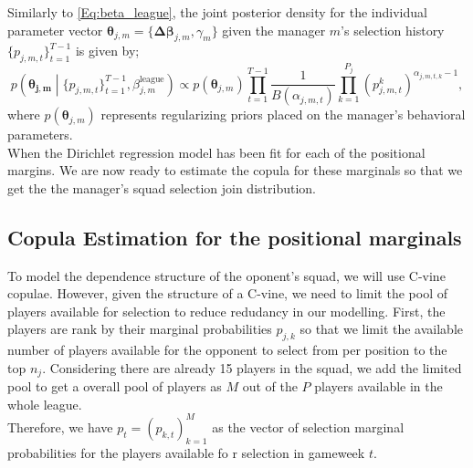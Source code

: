\documentclass[12pt,oneside,a4paper]{book}
\theoremstyle{definition}
\theoremstyle{remark}
\begin{document}
				Similarly to \eqref{Eq:beta_league}, the joint posterior density for the individual parameter vector $\boldsymbol{\theta}_{j,m} = \{\boldsymbol{\Delta\beta}_{j,m}, \gamma_m\}$ given the manager $m$'s selection history $\{p_{j,m,t}\}_{t=1}^{T-1}$ is given by;
				\begin{equation}\label{Eq:posterior_manager}
					p\left(\boldsymbol{\theta_{j,m}} \middle| \{p_{j,m,t}\}_{t=1}^{T-1}, \beta_{j,m}^{\text{league}}\right)
					\propto p(\boldsymbol{\theta}_{j,m}) \prod_{t=1}^{T-1} \frac{1}{B(\alpha_{j,m,t})} \prod_{k=1}^{P_j} \left(p_{j,m,t}^k\right)^{\alpha_{j,m,t,k} - 1},
				\end{equation}
				where $p(\boldsymbol{\theta}_{j,m})$ represents regularizing priors placed on the manager's behavioral parameters.\\  %
				When the Dirichlet regression model has been fit for each of the positional margins. We are now ready to estimate the copula for these marginals so that we get the the manager's squad selection join distribution.
				\subsection{Copula Estimation for the positional marginals}\label{sec:generate_w_o}
				To model the dependence structure of the oponent's squad, we will use C-vine copulae.
				However, given the structure of a C-vine, we need to limit the pool of players available for selection to reduce redudancy in our modelling.
				First, the players are rank by their marginal probabilities $p_{j,k}$ so that we limit the available number of players available for the opponent to select from per position to the top $n_j$. Considering there are already 15 players in the squad, we add the limited pool to get a overall pool of players as $M$ out of the $P$ players available in the whole league.\\
				Therefore, we have $p_t = \left( p_{k,t}\right)_{k=1}^M$ as the vector of selection marginal probabilities for the players available fo r selection in gameweek $t$.
\end{document}
